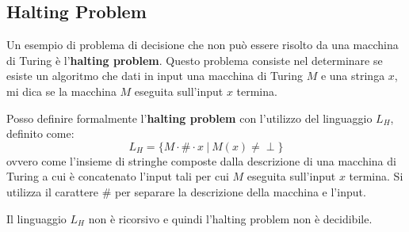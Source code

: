 \subsection{Halting Problem}
Un esempio di problema di decisione che non può essere risolto da una macchina
di Turing è l'\textbf{halting problem}. Questo problema consiste nel determinare
se esiste un algoritmo che dati in input una macchina di Turing $M$ e una stringa
$x$, mi dica se la macchina $M$ eseguita sull'input $x$ termina.
\begin{definizione}
    Posso definire formalmente l'\textbf{halting problem} con l'utilizzo del
    linguaggio $L_H$, definito come:
    \begin{equation}
        L_H = \{M \cdot \# \cdot x \ | \ M(x) \neq \perp \}
    \end{equation}
    ovvero come l'insieme di stringhe composte dalla descrizione di una macchina
    di Turing a cui è concatenato l'input tali per cui $M$ eseguita sull'input
    $x$ termina. Si utilizza il carattere $\#$ per separare la descrizione della
    macchina e l'input.
\end{definizione}
\begin{teorema}
    Il linguaggio $L_H$ non è ricorsivo e quindi l'halting problem non è
    decidibile.
\end{teorema}
